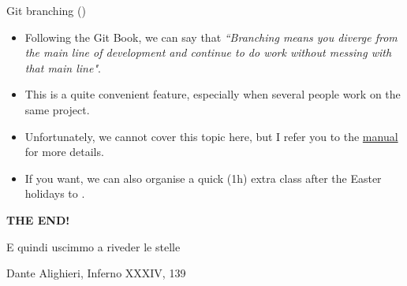 \documentclass[
hyperref={bookmarks=false},
xcolor={dvipsnames,svgnames*,x11names*}, 
12pt
]{beamer}
\begin{document}
\begin{frame}{Git branching ()}
\vspace{-0.5cm}
\begin{itemize}
\itemsep 2ex
\item Following the Git Book, we can say that \emph{``Branching means you diverge from the main line of development and continue to do work without messing with that main line"}.
\item This is a quite convenient feature, especially when several people work on the same project.
\item Unfortunately, we cannot cover this topic here, but I refer you to the \href{https://git-scm.com/book/en/v2/Git-Branching-Branches-in-a-Nutshell}{manual} for more details. 
\item If you want, we can also organise a quick (1h) extra class after the Easter holidays to . 
\end{itemize}
\end{frame}

\begin{frame}
\vspace{2cm}
\begin{center}
\Huge
\textbf{THE END!}
\end{center}
\vspace{1.5cm}
\epigraph{E quindi uscimmo a riveder le stelle}{Dante Alighieri, Inferno XXXIV, 139}
\end{frame}
\end{document}
